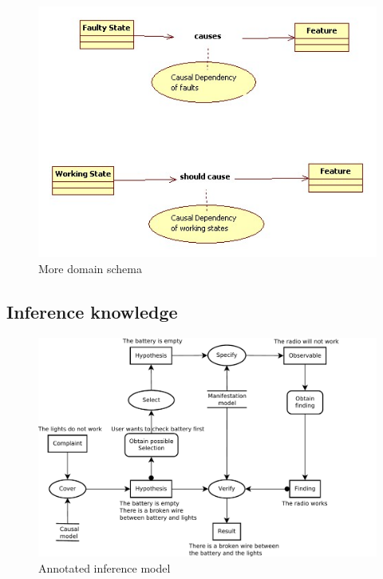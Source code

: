 \documentclass[a4paper,10pt]{article}
\begin{document}
\begin{figure}[htbp]
	\centering
		\includegraphics[width=1.00\textwidth]{ruleTypes.jpg}
	\caption{More domain schema}
	\label{fig:IS}
\end{figure}


\subsection{Inference knowledge}
\begin{figure}[htbp]
	\centering
		\includegraphics[width=1.00\textwidth]{InferenceModel.pdf}
	\caption{Annotated inference model}
	\label{fig:InferenceModel}
\end{figure}
\end{document}
